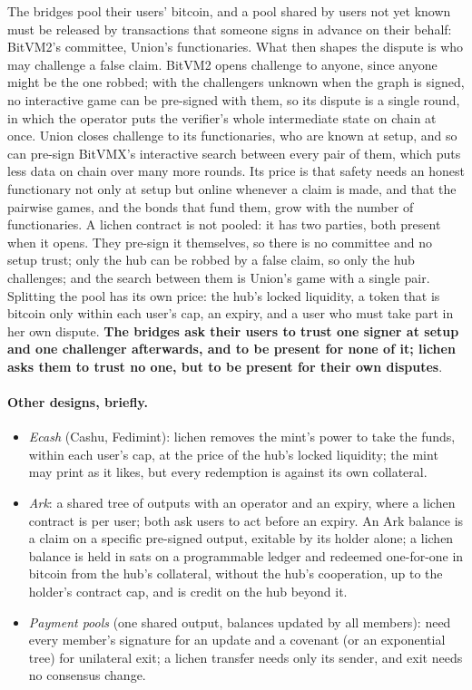 \documentclass[11pt]{article}
\begin{document}
The bridges pool their users' bitcoin, and a pool shared by users not
yet known must be released by transactions that someone signs in
advance on their behalf: BitVM2's committee, Union's functionaries.
What then shapes the dispute is who may challenge a false claim. BitVM2
opens challenge to anyone, since anyone might be the one robbed; with
the challengers unknown when the graph is signed, no interactive game
can be pre-signed with them, so its dispute is a single round, in which
the operator puts the verifier's whole intermediate state on chain at
once. Union closes challenge to its functionaries, who are known at
setup, and so can pre-sign BitVMX's interactive search between every
pair of them, which puts less data on chain over many more rounds. Its
price is that safety needs an honest functionary not only at setup but
online whenever a claim is made, and that the pairwise games, and the
bonds that fund them, grow with the number of functionaries. A lichen
contract is not pooled: it has two parties, both present when it opens.
They pre-sign it themselves, so there is no committee and no setup
trust; only the hub can be robbed by a false claim, so only the hub
challenges; and the search between them is Union's game with a single
pair. Splitting the pool has its own price: the hub's locked liquidity,
a token that is bitcoin only within each user's cap, an expiry, and a
user who must take part in her own dispute. \textbf{The bridges ask their users
to trust one signer at setup and one challenger afterwards, and to be
present for none of it; lichen asks them to trust no one, but to be
present for their own disputes}.

\paragraph{Other designs, briefly.}
\begin{itemize}[leftmargin=1.5em]
\item \emph{Ecash} (Cashu, Fedimint): lichen removes the mint's power to
  take the funds, within each user's cap, at the price of the hub's
  locked liquidity; the mint may print as it likes, but every redemption
  is against its own collateral.
\item \emph{Ark}: a shared tree of outputs with an operator and an
  expiry, where a lichen contract is per user; both ask users to act
  before an expiry. An Ark balance is a claim on a specific pre-signed
  output, exitable by its holder alone; a lichen balance is held in sats
  on a programmable ledger and redeemed one-for-one in bitcoin from the
  hub's collateral, without the hub's cooperation, up to the holder's
  contract cap, and is credit on the hub beyond it.
\item \emph{Payment pools} (one shared output, balances updated by all
  members): need every member's signature for an update and a covenant
  (or an exponential tree) for unilateral exit; a lichen transfer needs
  only its sender, and exit needs no consensus change.
\end{itemize}
\end{document}
